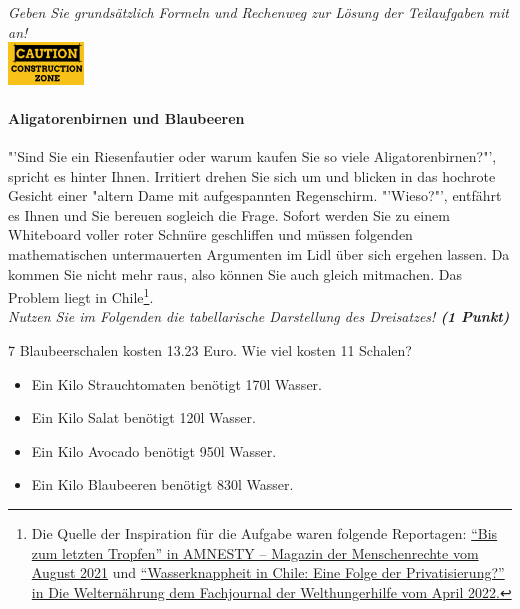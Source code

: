 \documentclass[a4paper, 9pt]{scrartcl}\usepackage[]{graphicx}\usepackage[]{xcolor}
\begin{document}
\textit{Geben Sie grunds{\"a}tzlich Formeln und Rechenweg zur L{\"o}sung der
  Teilaufgaben mit an!} \\[1Ex]

\hfill\href{https://youtu.be/SZqp_vy3rgI}{\includegraphics[width = 2cm]{img/caution}} %
\hspace{2Ex}

\paragraph{Aligatorenbirnen und Blaubeeren}




"'Sind Sie ein Riesenfautier oder warum kaufen Sie so viele
Aligatorenbirnen?"', spricht es hinter Ihnen. Irritiert drehen Sie sich um
und blicken in das hochrote Gesicht einer {"a}ltern Dame mit aufgespannten Regenschirm. "'Wieso?"', entfährt es
Ihnen und Sie bereuen sogleich die Frage. Sofort werden Sie zu einem
Whiteboard voller roter Schnüre geschliffen und müssen folgenden
mathematischen untermauerten Argumenten im Lidl über sich ergehen
lassen. Da kommen Sie nicht mehr raus, also können Sie auch gleich
mitmachen. Das Problem liegt in Chile\footnote{Die Quelle der Inspiration
  für die Aufgabe waren folgende Reportagen:
  \href{https://www.amnesty.ch/de/ueber-amnesty/publikationen/magazin-amnesty/2021-3/bis-zum-letzten-tropfen}{"`Bis
  zum letzten Tropfen"' in AMNESTY – Magazin der Menschenrechte vom August
  2021} und
\href{https://www.welthungerhilfe.de/welternaehrung/rubriken/klima-ressourcen/wassernot-in-chile-eine-folge-der-privatisierung}{"`Wasserknappheit
  in Chile: Eine Folge der Privatisierung?"' in Die Welternährung dem
  Fachjournal der Welthungerhilfe vom April 2022.}}. \\



\textit{Nutzen Sie im Folgenden die tabellarische Darstellung des
  Dreisatzes! \textbf{(1 Punkt)}}

7 Blaubeerschalen kosten 13.23 Euro. Wie viel kosten 11 Schalen?

\begin{itemize}[noitemsep]
\item Ein Kilo Strauchtomaten benötigt 170l Wasser.
\item Ein Kilo Salat benötigt 120l Wasser.
\item Ein Kilo Avocado benötigt 950l Wasser.
\item Ein Kilo Blaubeeren benötigt 830l Wasser.
\end{itemize}
\end{document}
